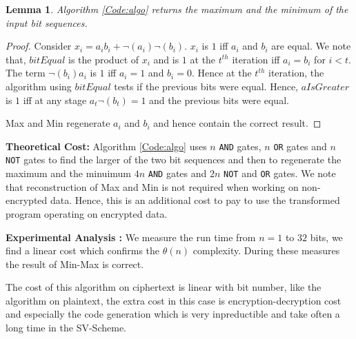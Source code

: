 \documentclass{acm_proc_article-sp}
\begin{document}
\newtheorem{theorem}{Lemma}
\begin{theorem}
Algorithm \autoref{Code:algo} returns the maximum and the minimum of the input bit sequences. 
\end{theorem}

\begin{proof}

Consider $x_i = a_ib_i+\neg(a_i)\neg(b_i) $. $x_i$ is $1$ iff $a_i$ and $b_i$ are equal. We note that, $bitEqual$ is the product of $x_i$ and is $1$ at the $t^{th}$ iteration iff $a_i=b_i$ for $i < t$. The term $\neg(b_i)a_i$ is $1$ iff $a_i=1$ and $b_i =0$. Hence at the $t^{th}$ iteration, the algorithm using $bitEqual$ tests if the previous bits were equal. Hence, $aIsGreater$ is $1$ iff at any stage  $a_t\neg(b_t)=1$ and the previous bits were equal.

Max and Min regenerate $a_i$ and $b_i$ and hence contain the correct result.  
\end{proof}
\textbf{Theoretical Cost:} Algorithm \autoref{Code:algo} uses $n$ \texttt{AND} gates, $n$ \texttt{OR} gates and $n$ \texttt{NOT} gates to find the larger of the two bit sequences and then to regenerate the maximum and the minuimum $4n$ \texttt{AND} gates and $2n$ \texttt{NOT} and \texttt{OR} gates. We note that reconstruction of Max and  Min is not required when working on non-encrypted data. Hence, this is an additional cost to pay to use the transformed program operating on encrypted data. 

\textbf{Experimental Analysis :} We measure the run time from $n=1$ to $32$ bits, we find a linear cost which confirms the $\theta(n)$ complexity. During these measures the result of Min-Max is correct.

The cost of this algorithm on ciphertext is linear with bit number, like  the algorithm on plaintext, the extra cost in this case is encryption-decryption cost and especially the code generation which is very inpreductible and take often a long time in the SV-Scheme.
\end{document}
